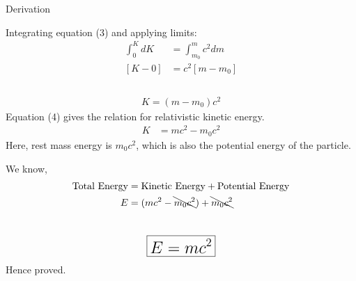 \documentclass[11pt]{beamer}
\begin{document}
\begin{frame}[t,allowframebreaks]{Derivation}
        \framebreak

        Integrating equation (3) and applying limits:
        \begin{align*}
            \int_{0}^{K} dK &= \int_{m_0}^{m} c^2 dm\\[5pt]
            [K - 0] &= c^2 [m - m_0]\\
        \end{align*}~\\[-50pt]
        \begin{align}
            \boxed{K = (m - m_0) c^2}
        \end{align}
        Equation (4) gives the relation for relativistic kinetic energy.
        \begin{align*}
            K &= mc^2 - m_0 c^2
        \end{align*}
        Here, rest mass energy is $m_0 c^2$, which is also the potential energy of the particle.

        \framebreak

        We know,\\[-20pt]
        \begin{align*}
            \text{Total Energy} &= \text{Kinetic Energy} + \text{Potential Energy}\\
            E & = (mc^2 - \bcancel{m_0 c^2}) + \bcancel{m_0 c^2}\\
        \end{align*}~\\[-40pt]
        \begin{align*}
            \LARGE\boxed{E = mc^2}
        \end{align*}
        Hence proved.
    \end{frame}
\end{document}
